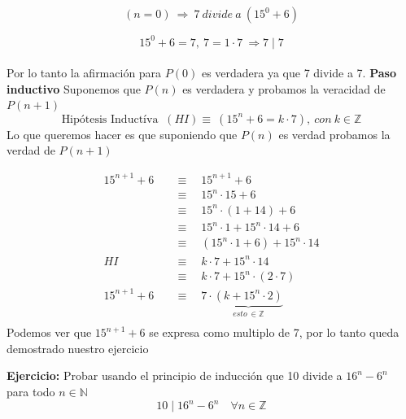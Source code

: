 \documentclass[12pt]{book}
\begin{document}
\[
(n=0 ) \ \Rightarrow \ 7 \ divide \ a \ (15^{0} + 6 )
\]

\[  15^{0} + 6 = 7  , \  7 = 1 \cdot 7  \ \Rightarrow 7\mid 7 \]
\\
Por lo tanto la afirmaci\'on para $P(0)$  es verdadera ya que 7 divide a 7.
\newline
\newline
\textbf{Paso inductivo} Suponemos que $P(n)$ es verdadera y probamos la veracidad de $P(n+1)$
\[
\text {Hip\'otesis  Induct\'iva } \ (HI) \equiv \ (15^{n} + 6 = k \cdot 7) ,\ con \ k \in \mathbb{Z} 
\]
\newline
Lo que queremos hacer es que suponiendo que $P(n)$ es verdad probamos la verdad de $P(n+1)$

\begin{equation*}
\begin{split}
15^{n+1} + 6 \quad   &\equiv \quad  15^{n+1} + 6   \\
&\equiv  \quad   15^{n} \cdot 15 + 6  \\
&\equiv  \quad   15^{n} \cdot (1 + 14) + 6 \\
&\equiv  \quad   15^{n} \cdot 1 + 15^{n} \cdot 14 + 6 \\ 
&\equiv  \quad   (15^{n} \cdot 1 + 6) +15^{n} \cdot 14  \\
HI \quad   &\equiv  \quad   k \cdot 7 +15^{n} \cdot 14  \\
\quad   &\equiv  \quad   k \cdot 7 +15^{n} \cdot (2 \cdot 7)  \\
15^{n+1} + 6 \quad   &\equiv  \quad  7 \cdot \underbrace{ (k +15^{n} \cdot 2)}_{ esto \ \in \mathbb{Z}}  \\
\end{split}
\end{equation*}
Podemos ver que $ 15^{n+1} + 6  $ se expresa como multiplo de 7, por lo tanto queda demostrado nuestro ejercicio

\begin{shaded}
\textbf{Ejercicio:} Probar usando el principio de inducción que 10 divide a $ 16^{n} - 6^{n}$ \\ para todo $n \in \mathbb N$  \\
\[	
	10  \mid 16^{n} - 6^{n} \quad \forall n \in \mathbb{Z}
\]
\end{shaded}
\end{document}
